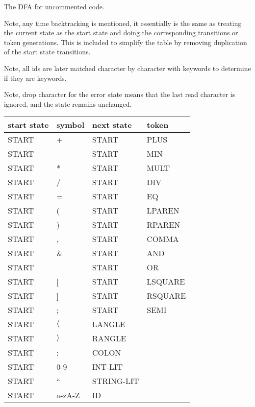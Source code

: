 \documentclass[11pt, fleqn]{article}
\begin{document}
The DFA for uncommented code.

Note, any time backtracking is mentioned, it essentially is the same as treating the current state as the start state and doing the corresponding transitions or token generations. This is included to simplify the table by removing duplication of the start state transitions.

Note, all ids are later matched character by character with keywords to determine if they are keywords.

Note, drop character for the error state means that the last read character is ignored, and the state remains unchanged.

\begin{longtable}{l|l|l|l}
start state		&	symbol						&	next	 state		&	token		 		\\
\hline
START			&	+								&	START			&	PLUS					\\
START			&	-								&	START			&	MIN					\\
START			&	*								&	START			&	MULT					\\
START			&	/								&	START			&	DIV					\\
START			&	=								&	START			&	EQ					\\
START			&	(								&	START			&	LPAREN				\\
START			&	)								&	START			&	RPAREN				\\
START			&	,								&	START			&	COMMA				\\
START			&	\&								&	START			&	AND					\\
START			&	\textbar								&	START			&	OR					\\
START			&	[								&	START			&	LSQUARE				\\
START			&	]								&	START			&	RSQUARE				\\
START			&	;								&	START			&	SEMI					\\
START			&	$\langle$						&	LANGLE			&						\\
START			&	$\rangle$						&	RANGLE			&						\\
START			&	:								&	COLON			&						\\
START			&	0-9								&	INT-LIT			&						\\
START			&	``								&	STRING-LIT		&						\\
START			&	a-zA-Z							&	ID				&						\\

\end{longtable}
\end{document}
